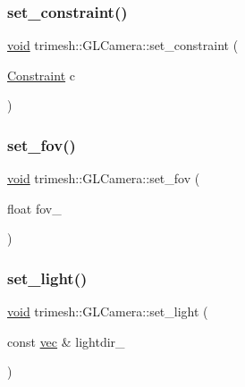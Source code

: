 \mbox{\label{classtrimesh_1_1GLCamera_a0f383a8117094b9013d3d945cc7dc979}} 
\subsubsection{\texorpdfstring{set\+\_\+constraint()}{set\_constraint()}}
{\footnotesize\ttfamily \hyperlink{namespacetrimesh_a784ddfd979e1c579bda795a8edfc3f43}{void} trimesh\+::\+G\+L\+Camera\+::set\+\_\+constraint (\begin{DoxyParamCaption}\item[{\hyperlink{classtrimesh_1_1GLCamera_a4b7300c68956c148f6f8b014217faed9}{Constraint}}]{c }\end{DoxyParamCaption})\hspace{0.3cm}{\ttfamily [inline]}}

\mbox{\label{classtrimesh_1_1GLCamera_a7020cc47b48ab434212155567c647faf}} 
\subsubsection{\texorpdfstring{set\+\_\+fov()}{set\_fov()}}
{\footnotesize\ttfamily \hyperlink{namespacetrimesh_a784ddfd979e1c579bda795a8edfc3f43}{void} trimesh\+::\+G\+L\+Camera\+::set\+\_\+fov (\begin{DoxyParamCaption}\item[{float}]{fov\+\_\+ }\end{DoxyParamCaption})\hspace{0.3cm}{\ttfamily [inline]}}

\mbox{\label{classtrimesh_1_1GLCamera_a1151d9c4aafcd873ba7df8e84669549a}} 
\subsubsection{\texorpdfstring{set\+\_\+light()}{set\_light()}}
{\footnotesize\ttfamily \hyperlink{namespacetrimesh_a784ddfd979e1c579bda795a8edfc3f43}{void} trimesh\+::\+G\+L\+Camera\+::set\+\_\+light (\begin{DoxyParamCaption}\item[{const \hyperlink{namespacetrimesh_a4fc2b83feba99c931f837a0c7d4b4df1}{vec} \&}]{lightdir\+\_\+ }\end{DoxyParamCaption})\hspace{0.3cm}{\ttfamily [inline]}}


